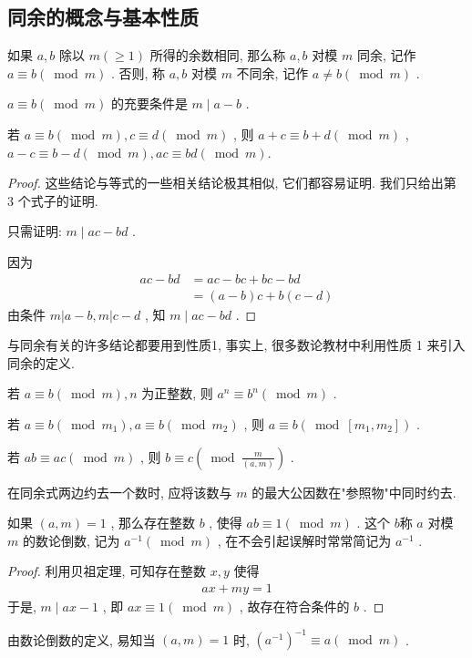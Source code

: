 \subsection{同余的概念与基本性质}
\begin{definition}
	如果 $a ,  b$ 除以 $m(\geqslant 1)$ 所得的余数相同, 那么称 $a ,  b$ 对模 $m$ 同余, 记作 $a \equiv b(\bmod m)$ . 否则, 称 $a ,  b$ 对模 $m$ 不同余, 记作 $a \neq b(\bmod m)$ .
\end{definition}
\begin{property}
	$a \equiv b(\bmod m)$ 的充要条件是 $m \mid a-b$ .
\end{property}
\begin{property}
	若 $a \equiv b(\bmod m), c \equiv d(\bmod m)$ , 则 $a+c \equiv b+d(\bmod m)$ ,  $a-c \equiv b-d(\bmod m), a c \equiv b d(\bmod m)$.
\end{property}
\begin{proof}
	这些结论与等式的一些相关结论极其相似, 它们都容易证明. 我们只给出第 3 个式子的证明.

	只需证明:  $m \mid a c-b d$ .

	因为
	\begin{align}
		a c-b d & =a c-b c+b c-b d \\
		        & =(a-b) c+b(c-d)
	\end{align}
	由条件 $m|a-b, m| c-d$ , 知 $m \mid a c-b d$ .
\end{proof}
\begin{note}
	与同余有关的许多结论都要用到性质1, 事实上, 很多数论教材中利用性质 1 来引入同余的定义.
\end{note}

\begin{property}
	若 $a \equiv b(\bmod m), n$ 为正整数, 则 $a^{n} \equiv b^{n}(\bmod m)$ .
\end{property}
\begin{property}
	若 $a \equiv b\left(\bmod m_{1}\right), a \equiv b\left(\bmod m_{2}\right)$ , 则 $a \equiv b\left(\bmod \left[m_{1}, m_{2}\right]\right)$ .
\end{property}
\begin{property}
	若 $a b \equiv a c(\bmod m)$ , 则 $b \equiv c\left(\bmod \frac{m}{(a, m)}\right)$ .
\end{property}

在同余式两边约去一个数时, 应将该数与 $m$ 的最大公因数在"参照物"中同时约去.
\begin{property}
	如果 $(a, m)=1$ , 那么存在整数 $b$ , 使得 $a b \equiv 1(\bmod m)$ . 这个 $b$称 $a$ 对模 $m$ 的数论倒数, 记为 $a^{-1}(\bmod m)$ , 在不会引起误解时常常简记为 $a^{-1}$ .
\end{property}
\begin{proof}
	利用贝祖定理, 可知存在整数 $x ,  y$ 使得
	\begin{align*}
		a x+m y=1
	\end{align*}
	于是,  $m \mid a x-1$ , 即 $a x \equiv 1(\bmod m)$ , 故存在符合条件的 $b$ .
\end{proof}
\begin{note}
	由数论倒数的定义, 易知当 $(a, m)=1$ 时,  $\left(a^{-1}\right)^{-1} \equiv a(\bmod m)$ .
\end{note}


